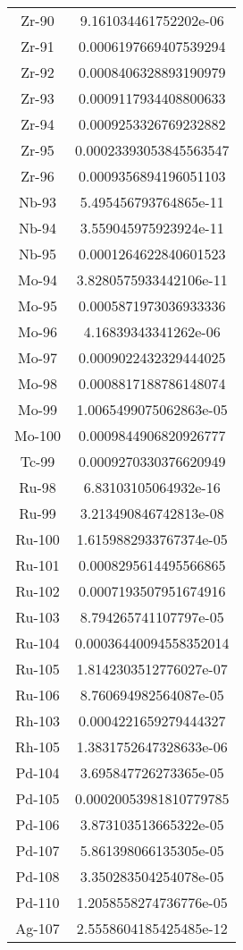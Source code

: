 \begin{table}[h!]
\begin{tabular}{|| c || c |}
Zr-90 & 9.161034461752202e-06 \\
Zr-91 & 0.0006197669407539294 \\
Zr-92 & 0.0008406328893190979 \\
Zr-93 & 0.0009117934408800633 \\
Zr-94 & 0.0009253326769232882 \\
Zr-95 & 0.00023393053845563547 \\
Zr-96 & 0.0009356894196051103 \\
Nb-93 & 5.495456793764865e-11 \\
Nb-94 & 3.559045975923924e-11 \\
Nb-95 & 0.0001264622840601523 \\
Mo-94 & 3.8280575933442106e-11 \\
Mo-95 & 0.0005871973036933336 \\
Mo-96 & 4.16839343341262e-06 \\
Mo-97 & 0.0009022432329444025 \\
Mo-98 & 0.0008817188786148074 \\
Mo-99 & 1.0065499075062863e-05 \\
Mo-100 & 0.0009844906820926777 \\
Tc-99 & 0.0009270330376620949 \\
Ru-98 & 6.83103105064932e-16 \\
Ru-99 & 3.213490846742813e-08 \\
Ru-100 & 1.6159882933767374e-05 \\
Ru-101 & 0.0008295614495566865 \\
Ru-102 & 0.0007193507951674916 \\
Ru-103 & 8.794265741107797e-05 \\
Ru-104 & 0.00036440094558352014 \\
Ru-105 & 1.8142303512776027e-07 \\
Ru-106 & 8.760694982564087e-05 \\
Rh-103 & 0.0004221659279444327 \\
Rh-105 & 1.3831752647328633e-06 \\
Pd-104 & 3.695847726273365e-05 \\
Pd-105 & 0.00020053981810779785 \\
Pd-106 & 3.873103513665322e-05 \\
Pd-107 & 5.861398066135305e-05 \\
Pd-108 & 3.350283504254078e-05 \\
Pd-110 & 1.2058558274736776e-05 \\
Ag-107 & 2.5558604185425485e-12 \\

\end{tabular}
\end{table}
